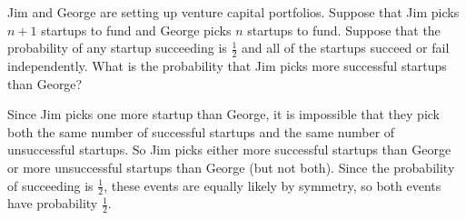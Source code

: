 \question Jim and George are setting up venture capital portfolios. 
Suppose that Jim picks $n + 1$ startups to fund and George picks $n$ 
startups to fund. Suppose that the probability of any startup succeeding 
is $\frac{1}{2}$  and all of the startups succeed or fail independently. 
What is the probability that Jim picks more successful startups than 
George?
\begin{solution}[5cm]
Since Jim picks one more startup than George, it is impossible that 
they pick both the same number of successful startups and the same 
number of unsuccessful startups. So Jim picks either more successful 
startups than George or more unsuccessful startups than George (but not 
both). Since the probability of
succeeding is $\frac{1}{2}$, these events are equally likely by symmetry, 
so both events have
probability $\frac{1}{2}$.
\end{solution}